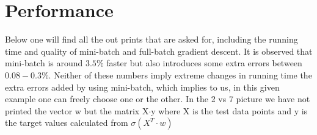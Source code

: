 \documentclass[paper=a4, fontsize=11pt]{scrartcl} %
\numberwithin{equation}{section} %
\numberwithin{figure}{section} %
\numberwithin{table}{section} %
\begin{document}
\section*{Performance}
Below one will find all the out prints that are asked for, including the running time and quality of mini-batch and full-batch gradient descent. It is observed that mini-batch is around $3.5\%$ faster but also introduces some extra errors between $0.08-0.3\%$. Neither of these numbers imply extreme changes in running time the extra errors added by using mini-batch, which implies to us, in this given example one can freely choose one or the other. In the 2 vs 7 picture we have not printed the vector w but the matrix X$\cdot$y where X is the test data points and y is the target values calculated from $\sigma(X^T\cdot w)$
\\ \\
\end{document}
